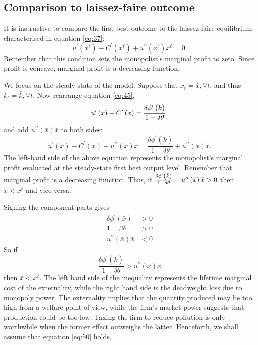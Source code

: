 \subsection{Comparison to laissez-faire outcome}

\label{sec:comp-laiss-faire}

It is instructive to compare the first-best outcome to the laissez-faire
equilibrium characterised in equation \eqref{eq:37}: 
\begin{equation}
u^{\prime }\left( x^{\ell }\right) -C^{\prime }\left( x^{\ell }\right)
+u^{\prime \prime }\left( x^{\ell }\right) x^{\ell }=0.  \label{eq:46}
\end{equation}%
Remember that this condition sets the monopolist's marginal profit to zero.
Since profit is concave, marginal profit is a decreasing function.

We focus on the steady state of the model. Suppose that $x_{t}=\bar{x}%
,\forall t$, and thus $k_{t}=\bar{k},\forall t$. Now rearrange equation %
\eqref{eq:45}, 
\begin{equation}
u^{\prime }\left( \bar{x}\right) -C^{\prime }\left( \bar{x}\right) =\frac{%
\delta \phi ^{\prime }\left( \bar{k}\right) }{1-\delta \theta },
\label{eq:47}
\end{equation}%
and add $u^{\prime \prime }\left( \bar{x}\right) \bar{x}$ to both sides: 
\begin{equation}
u^{\prime }\left( \bar{x}\right) -C^{\prime }\left( \bar{x}\right)
+u^{\prime \prime }\left( \bar{x}\right) \bar{x}=\frac{\delta \phi ^{\prime
}\left( \bar{k}\right) }{1-\delta \theta }+u^{\prime \prime }\left( \bar{x}%
\right) \bar{x}.  \label{eq:48}
\end{equation}%
The left-hand side of the above equation represents the monopolist's
marginal profit evaluated at the steady-state first best output level.
Remember that marginal profit is a decreasing function. Thus, if $\frac{%
\delta \phi ^{\prime }\left( \bar{k}\right) }{1-\delta \theta }+u^{\prime
\prime }\left( \bar{x}\right) \bar{x}>0$ then $\bar{x}<x^{\ell }$ and vice
versa.

Signing the component parts gives 
\begin{align}
\delta \phi ^{\prime }\left( \bar{x}\right) & >0  \label{eq:49} \\
1-\beta \delta & >0 \\
u^{\prime \prime }\left( \bar{x}\right) \bar{x}& <0
\end{align}%
So if 
\begin{equation}
\frac{\delta \phi ^{\prime }\left( \bar{k}\right) }{1-\delta \theta }%
>u^{\prime \prime }\left( \bar{x}\right) \bar{x}  \label{eq:50}
\end{equation}%
then $\bar{x}<x^{\ell }$. The left hand side of the inequality represents
the lifetime marginal cost of the externality, while the right hand side is
the deadweight loss due to monopoly power. The externality implies that the
quantity produced may be too high from a welfare point of view, while the
firm's market power suggests that production could be too low. Taxing the
firm to reduce pollution is only worthwhile when the former effect outweighs
the latter. Henceforth, we shall assume that equation \eqref{eq:50} holds.

